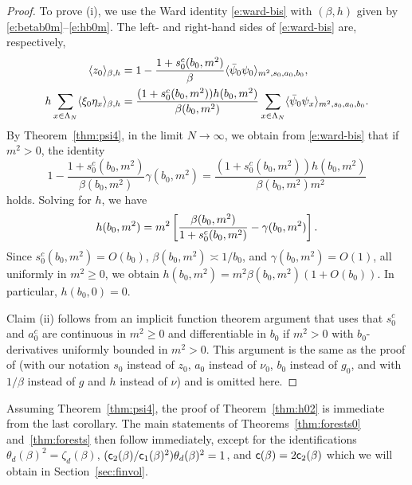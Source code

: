\documentclass[11pt]{amsart}
\numberwithin{equation}{section}
\numberwithin{theorem}{section}
\newcommand{\1}{{\bf 1}}
\newcommand{\consta}{{\sf c}_1}
\newcommand{\constb}{{\sf c}_2}
\newcommand{\consto}{{\sf c}}
\newcommand{\cgamma}{\gamma}
\begin{document}
\begin{proof}
  To prove (i), we use the Ward identity \eqref{e:ward-bis} with $(\beta,h)$ given by \eqref{e:betab0m}--\eqref{e:hb0m}.
  The left- and right-hand sides of \eqref{e:ward-bis} are, respectively,
  \begin{align}
        \label{e:ward-pf-1}
  \langle z_0 \rangle_{\beta,h} &= 1-\frac{1+s_0^c(b_0,m^2)}{\beta} \langle \bar\psi_0\psi_0 \rangle_{m^2,s_0,a_0,b_0} ,
    \\
    \label{e:ward-pf-2}
  h \sum_{x\in\Lambda_N} \langle \xi_0 \eta_x \rangle_{\beta,h}
                      &=  \frac{(1+s_0^c(b_0,m^2))h(b_0,m^2)}{\beta(b_0,m^2)} \sum_{x\in\Lambda_N} \langle \bar\psi_0\psi_x \rangle_{m^2,s_0,a_0,b_0} .
\end{align}
By Theorem~\ref{thm:psi4}, in the limit $N\to\infty$, we obtain
from \eqref{e:ward-bis} that if $m^{2}>0$, the identity
\begin{equation}
  1-\frac{1+s_0^c(b_0,m^2)}{\beta(b_0,m^2)}\cgamma(b_0,m^2) = \frac{(1+s_0^c(b_0,m^2))h(b_0,m^2)}{\beta(b_0,m^2) m^2}
\end{equation}
holds.  Solving for $h$, we have
\begin{equation}
  h(b_0,m^2)= m^2 \qa{ \frac{\beta(b_0,m^2)}{1+s_0^c(b_0,m^2)} - \cgamma(b_0,m^2) }.
\end{equation}
Since $s_0^c(b_0,m^2)=O(b_0)$, $\beta(b_{0},m^{2}) \asymp 1/b_0$, and $\cgamma(b_0,m^2)=O(1)$,
all uniformly in $m^2\geq 0$, we obtain
$h(b_0,m^2) = m^2 \beta(b_0,m^2)(1+O(b_0))$. In particular, $h(b_0,0)=0$.

Claim (ii)
follows from an implicit function theorem argument that uses that $s_0^c$ and $a_0^c$ are continuous in $m^2\geq 0$ and differentiable in $b_0$ if $m^2>0$ with  $b_0$-derivatives uniformly bounded in $m^2>0$.
This argument is the same as the proof of \cite[Proposition~4.2]{MR3339164}
(with our notation $s_0$ instead of $z_0$, $a_0$ instead of $\nu_0$, $b_0$ instead of $g_0$,
and with $1/\beta$ instead of $g$ and $h$ instead of $\nu$)  and is omitted here.
\end{proof}

Assuming Theorem~\ref{thm:psi4}, the proof of Theorem~\ref{thm:h02} is
immediate from the last corollary. The main statements of
Theorems~\ref{thm:forests0} and~\ref{thm:forests} then follow
immediately, except for the identifications
$\theta_{d}(\beta)^{2}=\zeta_{d}(\beta)$, 
$(\constb(\beta)/\consta(\beta)^{2})\theta_{d}(\beta)^{2}=1$, and
$\consto(\beta)=2\constb(\beta)$ which
we will obtain in Section~\ref{sec:finvol}.
\end{document}
